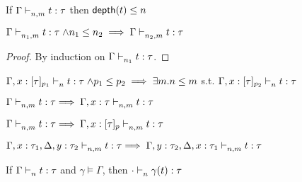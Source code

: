 \documentclass[a4paper,11pt]{article}
\theoremstyle{definition}
\begin{document}
\begin{lem} 
	\label{lem:2}
	If $\Gamma \mathrel{\vdash_{n,m}^{} {t} : {\tau}} $ then $\mathsf{depth}(t) \leq n$\\
\end{lem}
%
%
%
\begin{lem} 
	\label{lem:deweaken1}
	$\Gamma \mathrel{\vdash_{n_1,m}^{} {t} : {\tau}} \land n_1 \leq n_2 \implies \Gamma \mathrel{\vdash_{n_2,m}^{} {t} : {\tau}}$\\
\end{lem}
\begin{proof}
  By induction on $\Gamma \mathrel{\vdash_{n_1}^{} {t} : {\tau}}  $.
\end{proof}

\begin{lem} 
	\label{lem:deweaken2}
	$\Gamma, x:[\tau]_{p_1} \mathrel{\vdash_{n}^{} {t} : {\tau}} \land p_1 \leq p_2 \implies \exists m. n \leq m$ s.t. $\Gamma, x:[\tau]_{p_2} \mathrel{\vdash_{n}^{} {t} : {\tau}} $\\
\end{lem}
%
%
%
\begin{lem}
    \label{lem:coweaken1}
    $\Gamma \mathrel{\vdash_{n,m}^{} {t} : {\tau}}  \implies \Gamma, x:\tau \mathrel{\vdash_{n,m}^{} {t} : {\tau}} $\\
\end{lem}

\begin{lem}
    \label{lem:coweaken2}
    $\Gamma \mathrel{\vdash_{n,m}^{} {t} : {\tau}}  \implies \Gamma, x:[\tau]_p \mathrel{\vdash_{n,m}^{} {t} : {\tau}} $\\
\end{lem}



\begin{lem}
    \label{lem:coex}
    $\Gamma, x : \tau_1, \Delta, y : \tau_2 \mathrel{\vdash_{n,m}^{} {t} : {\tau}}  \implies \Gamma, y : \tau_2, \Delta, x : \tau_1 \mathrel{\vdash_{n,m}^{} {t} : {\tau}} $\\
\end{lem}

\begin{lem}
	\label{lem:sub}
	If $\Gamma \mathrel{\vdash_{n}^{} {t} : {\tau}}$ and $\gamma \vDash \Gamma$, then $ \cdot \mathrel{\vdash_{n}^{} {\gamma(t)} : {\tau}} $\\
\end{lem}
\end{document}

